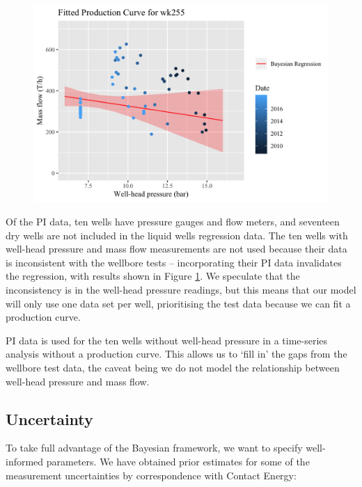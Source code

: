 \documentclass[a4paper, 12pt]{article}
\begin{document}

\begin{figure}
  \centering
  \includegraphics[width=\linewidth]{media/wk255_issue}
  \label{fig:wk255_issue}
\end{figure}

Of the PI data, ten wells have pressure gauges and flow meters, and seventeen dry wells are not included in the liquid wells regression data. The ten wells with well-head pressure and mass flow measurements are not used because their data is inconsistent with the wellbore tests -- incorporating their PI data invalidates the regression, with results shown in Figure \ref{fig:wk255_issue}. We speculate that the inconsistency is in the well-head pressure readings, but this means that our model will only use one data set per well, prioritising the test data because we can fit a production curve.

PI data is used for the ten wells without well-head pressure in a time-series analysis without a production curve. This allows us to `fill in' the gaps from the wellbore test data, the caveat being we do not model the relationship between well-head pressure and mass flow.

\subsection{Uncertainty}
To take full advantage of the Bayesian framework, we want to specify well-informed parameters. We have obtained prior estimates for some of the measurement uncertainties by correspondence with Contact Energy:
\end{document}
